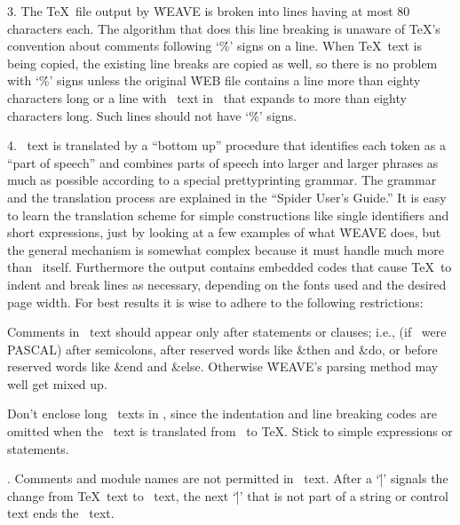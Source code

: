 3.
The \TeX\ file output by \.{WEAVE} is broken into lines having at most
80 characters each.
The algorithm that does this line breaking is unaware
of \TeX's convention about comments following `\.\%' signs on a line.
When
\TeX\ text is being copied, the existing line breaks are copied as well,
so there is no problem with `\.\%' signs unless the original \.{WEB} file
contains a line more than eighty characters long or a line with \PASCAL\
text in \pb\ that expands to more than eighty characters long.
Such lines
should not have `\.\%' signs.

4.
\PASCAL\ text is translated by a ``bottom up'' procedure that
identifies each token as a ``part of speech'' and combines parts of speech
into larger and larger phrases as much as possible according to a special
\newstuff prettyprinting \endnewstuff
grammar.
The grammar and the translation process are explained in the
``Spider User's Guide.'' 
It is easy to
learn the translation scheme for simple constructions like single
identifiers and short expressions, just by looking at a few examples of
what \.{WEAVE} does, but the general mechanism is somewhat complex because
it must handle much more than \PASCAL\ itself.
Furthermore the output
contains embedded codes that cause \TeX\ to indent and break lines as
necessary, depending on the fonts used and the desired page width.
For
best results it is wise to adhere to the following restrictions:

\yskip{}Comments in \PASCAL\ text should appear only after
statements or clauses; i.e., 
\newstuff(if \PASCAL\ were PASCAL) \endnewstuff
after semicolons, after reserved words like
\&{then} and \&{do}, or before reserved words like \&{end} and \&{else}.
Otherwise \.{WEAVE}'s parsing method may well get mixed up.

Don't enclose long \PASCAL\ texts in \pb, since the
indentation and line breaking codes are omitted when the \pb\ text is
translated from \PASCAL\ to \TeX.
Stick to simple expressions or
statements.

.
Comments and module names are not permitted in \pb\ text.
After a `\.|'
signals the change from \TeX\ text to \PASCAL\ text, the next `\.|' that is
not part of a string or control text ends the \PASCAL\ text.

